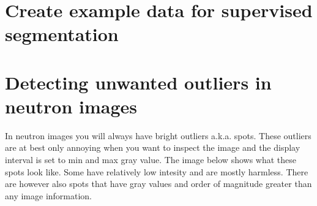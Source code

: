 \documentclass[letterpaper,10pt,english]{sphinxmanual}
\begin{document}
\section{Create example data for supervised segmentation}
\label{\detokenize{ML4NeutronImageSegmentation:create-example-data-for-supervised-segmentation}}
\begin{sphinxVerbatim}[commandchars=\\\{\}]
    
   \PYG{p}{[} \PYG{p}{]}
\PYG{p}{[}\PYG{p}{]}  
   
\end{sphinxVerbatim}

\noindent{}


\section{Detecting unwanted outliers in neutron images}
\label{\detokenize{ML4NeutronImageSegmentation:detecting-unwanted-outliers-in-neutron-images}}
In neutron images you will always have bright outliers a.k.a. spots. These outliers are at best only annoying when you want to inspect the image and the display interval is set to min and max gray value. The image below shows what these spots look like. Some have relatively low intesity and are mostly harmless. There are however also spots that have gray values and order of magnitude greater than any image information.
\end{document}
